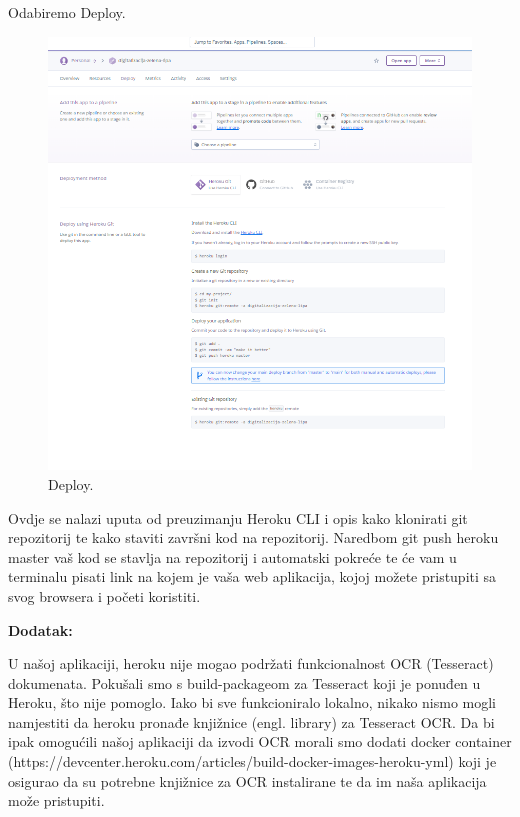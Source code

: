 			 Odabiremo Deploy.
			 \begin{figure}[H]
			 	\includegraphics[scale=0.7]{slike/Deploy.png} 
			 	\centering
			 	\caption{ Deploy.}
			 	\label{DPL}
			 \end{figure}
			 
			 Ovdje se nalazi uputa od preuzimanju Heroku CLI i opis kako klonirati git repozitorij te kako staviti završni kod na repozitorij. Naredbom git push heroku master vaš kod se stavlja na repozitorij i automatski pokreće te će vam u terminalu pisati link na kojem je vaša web aplikacija, kojoj možete pristupiti sa svog browsera i početi koristiti.
			 \eject
			 
			 \textbf{Dodatak:}
			 
			 U našoj aplikaciji, heroku nije mogao podržati funkcionalnost OCR (Tesseract) dokumenata. Pokušali smo s build-packageom za Tesseract koji je ponuđen u Heroku, što nije pomoglo. Iako bi sve funkcioniralo lokalno, nikako nismo mogli namjestiti da heroku pronađe knjižnice (engl. library) za Tesseract OCR. Da bi ipak omogućili našoj aplikaciji da izvodi OCR morali smo dodati docker container (https://devcenter.heroku.com/articles/build-docker-images-heroku-yml) koji je osigurao da su potrebne knjižnice za OCR instalirane te da im naša aplikacija može pristupiti.
			 
			 
			
			
			 
			
			
			\eject 